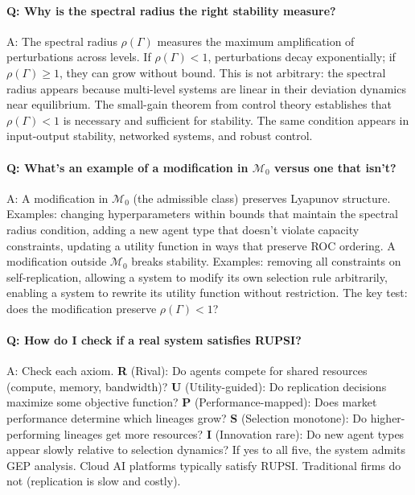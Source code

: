 \documentclass[12pt]{article}
\begin{document}
\paragraph{Q: Why is the spectral radius the right stability measure?}

A: The spectral radius $\rho(\Gamma)$ measures the maximum amplification of perturbations across levels. If $\rho(\Gamma) < 1$, perturbations decay exponentially; if $\rho(\Gamma) \geq 1$, they can grow without bound. This is not arbitrary: the spectral radius appears because multi-level systems are linear in their deviation dynamics near equilibrium. The small-gain theorem from control theory establishes that $\rho(\Gamma) < 1$ is necessary and sufficient for stability. The same condition appears in input-output stability, networked systems, and robust control.

\paragraph{Q: What's an example of a modification in $\mathcal{M}_0$ versus one that isn't?}

A: A modification in $\mathcal{M}_0$ (the admissible class) preserves Lyapunov structure. Examples: changing hyperparameters within bounds that maintain the spectral radius condition, adding a new agent type that doesn't violate capacity constraints, updating a utility function in ways that preserve ROC ordering. A modification outside $\mathcal{M}_0$ breaks stability. Examples: removing all constraints on self-replication, allowing a system to modify its own selection rule arbitrarily, enabling a system to rewrite its utility function without restriction. The key test: does the modification preserve $\rho(\Gamma) < 1$?

\paragraph{Q: How do I check if a real system satisfies RUPSI?}

A: Check each axiom. \textbf{R} (Rival): Do agents compete for shared resources (compute, memory, bandwidth)? \textbf{U} (Utility-guided): Do replication decisions maximize some objective function? \textbf{P} (Performance-mapped): Does market performance determine which lineages grow? \textbf{S} (Selection monotone): Do higher-performing lineages get more resources? \textbf{I} (Innovation rare): Do new agent types appear slowly relative to selection dynamics? If yes to all five, the system admits GEP analysis. Cloud AI platforms typically satisfy RUPSI. Traditional firms do not (replication is slow and costly).
\end{document}
